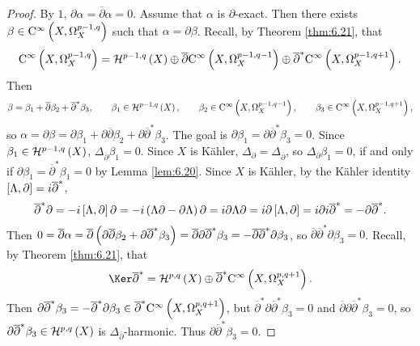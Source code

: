 \begin{proof}
By $ 1 $, $ \partial\alpha = \overline{\partial}\alpha = 0 $. Assume that $ \alpha $ is $ \partial $-exact. Then there exists $ \beta \in \C^\infty\br{X, \Omega_X^{p - 1, q}} $ such that $ \alpha = \partial\beta $. Recall, by Theorem \ref{thm:6.21}, that
$$ \C^\infty\br{X, \Omega_X^{p - 1, q}} = \HHH^{p - 1, q}\br{X} \oplus \overline{\partial}\C^\infty\br{X, \Omega_X^{p - 1, q - 1}} \oplus \overline{\partial}^*\C^\infty\br{X, \Omega_X^{p - 1, q + 1}}. $$
Then
$$ \beta = \beta_1 + \overline{\partial}\beta_2 + \overline{\partial}^*\beta_3, \qquad \beta_1 \in \HHH^{p - 1, q}\br{X}, \qquad \beta_2 \in \C^\infty\br{X, \Omega_X^{p - 1, q - 1}}, \qquad \beta_3 \in \C^\infty\br{X, \Omega_X^{p - 1, q + 1}}, $$
so $ \alpha = \partial\beta = \partial\beta_1 + \partial\overline{\partial}\beta_2 + \partial\overline{\partial}^*\beta_3 $. The goal is $ \partial\beta_1 = \partial\overline{\partial}^*\beta_3 = 0 $. Since $ \beta_1 \in \HHH^{p - 1, q}\br{X} $, $ \Delta_{\overline{\partial}}\beta_1 = 0 $. Since $ X $ is K\"ahler, $ \Delta_\partial = \Delta_{\overline{\partial}} $, so $ \Delta_\partial\beta_1 = 0 $, if and only if $ \partial\beta_1 = \overline{\partial}^*\beta_1 = 0 $ by Lemma \ref{lem:6.20}. Since $ X $ is K\"ahler, by the K\"ahler identity $ \sbr{\Lambda, \partial} = i\overline{\partial}^* $,
$$ \overline{\partial}^*\partial = -i\sbr{\Lambda, \partial}\partial = -i\br{\Lambda\partial - \partial\Lambda}\partial = i\partial\Lambda\partial = i\partial\sbr{\Lambda, \partial} = i\partial i\overline{\partial}^* = -\partial\overline{\partial}^*. $$
Then $ 0 = \overline{\partial}\alpha = \overline{\partial}\br{\partial\overline{\partial}\beta_2 + \partial\overline{\partial}^*\beta_3} = \overline{\partial}\partial\overline{\partial}^*\beta_3 = -\overline{\partial}\overline{\partial}^*\partial\beta_3 $, so $ \overline{\partial}\overline{\partial}^*\partial\beta_3 = 0 $. Recall, by Theorem \ref{thm:6.21}, that
$$ \Ker \overline{\partial}^* = \HHH^{p, q}\br{X} \oplus \overline{\partial}^*\C^\infty\br{X, \Omega_X^{p, q + 1}}. $$
Then $ \partial\overline{\partial}^*\beta_3 = -\overline{\partial}^*\partial\beta_3 \in \overline{\partial}^*\C^\infty\br{X, \Omega_X^{p, q + 1}} $, but $ \overline{\partial}^*\partial\overline{\partial}^*\beta_3 = 0 $ and $ \overline{\partial}\partial\overline{\partial}^*\beta_3 = 0 $, so $ \partial\overline{\partial}^*\beta_3 \in \HHH^{p, q}\br{X} $ is $ \Delta_{\overline{\partial}} $-harmonic. Thus $ \partial\overline{\partial}^*\beta_3 = 0 $.
\end{proof}

